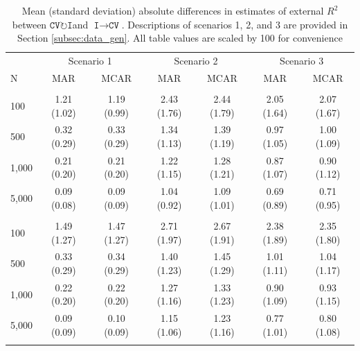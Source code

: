 \documentclass[AMA,STIX1COL,doublespace]{WileyNJD-v2}
\begin{document}
\begin{table}

\caption{\label{tab:cv_diffs}Mean (standard deviation) absolute differences in estimates of external $R^2$ between $\texttt{CV}\!\circlearrowright\!\texttt{I}$\space and $\texttt{I}\!\!\rightarrow\!\texttt{CV}$. Descriptions of scenarios 1, 2, and 3 are provided in Section \ref{subsec:data_gen}. All table values are scaled by 100 for convenience}
\centering
\begin{tabular}[t]{lcccccc}
\toprule
\multicolumn{1}{c}{ } & \multicolumn{2}{c}{Scenario 1} & \multicolumn{2}{c}{Scenario 2} & \multicolumn{2}{c}{Scenario 3} \\
\cmidrule(l{3pt}r{3pt}){2-3} \cmidrule(l{3pt}r{3pt}){4-5} \cmidrule(l{3pt}r{3pt}){6-7}
N & MAR & MCAR & MAR & MCAR & MAR & MCAR\\
\midrule
\addlinespace[0.75em]
\multicolumn{7}{l}{\textbf{10 predictors, 10 junk}}\\
\hline
\hspace{1em}100 & 1.21 (1.02) & 1.19 (0.99) & 2.43 (1.76) & 2.44 (1.79) & 2.05 (1.64) & 2.07 (1.67)\\
\hspace{1em}500 & 0.32 (0.29) & 0.33 (0.29) & 1.34 (1.13) & 1.39 (1.19) & 0.97 (1.05) & 1.00 (1.09)\\
\hspace{1em}1,000 & 0.21 (0.20) & 0.21 (0.20) & 1.22 (1.15) & 1.28 (1.21) & 0.87 (1.07) & 0.90 (1.12)\\
\hspace{1em}5,000 & 0.09 (0.08) & 0.09 (0.09) & 1.04 (0.92) & 1.09 (1.01) & 0.69 (0.89) & 0.71 (0.95)\\
\addlinespace[0.75em]
\multicolumn{7}{l}{\textbf{10 predictors, 40 junk}}\\
\hline
\hspace{1em}100 & 1.49 (1.27) & 1.47 (1.27) & 2.71 (1.97) & 2.67 (1.91) & 2.38 (1.89) & 2.35 (1.80)\\
\hspace{1em}500 & 0.33 (0.29) & 0.34 (0.29) & 1.40 (1.23) & 1.45 (1.29) & 1.01 (1.11) & 1.04 (1.17)\\
\hspace{1em}1,000 & 0.22 (0.20) & 0.22 (0.20) & 1.27 (1.16) & 1.33 (1.23) & 0.90 (1.09) & 0.93 (1.15)\\
\hspace{1em}5,000 & 0.09 (0.09) & 0.10 (0.09) & 1.15 (1.06) & 1.23 (1.16) & 0.77 (1.01) & 0.80 (1.08)\\
\addlinespace[0.75em]

\end{tabular}
\end{table}
\end{document}
